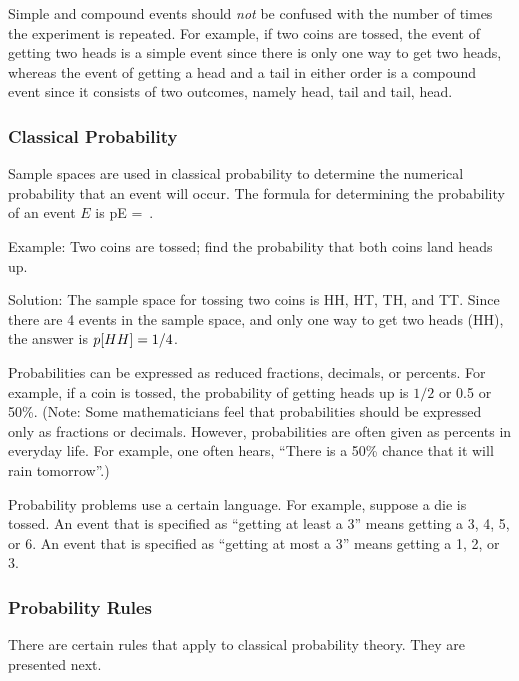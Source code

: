Simple and compound events should \emph{not} be confused with the number of times the experiment is repeated. For example, if two coins are tossed, the event of getting two heads is a simple event since there is only one way to get two heads, whereas the event of getting a head and a tail in either order is a compound event since it consists of two outcomes, namely head, tail and tail, head.


\subsubsection{Classical Probability}
Sample spaces are used in classical probability to determine the numerical probability that an event will occur. The formula for determining the probability of an event $E$ is
\beq
p\vat E = \,.
\eeq

Example: Two coins are tossed; find the probability that both coins land
heads up.

Solution: The sample space for tossing two coins is HH, HT, TH, and TT. Since there are 4 events in the sample space, and only one way to get two heads (HH), the answer is $p\!\left[{HH}\right] = 1/4$.

Probabilities can be expressed as reduced fractions, decimals, or percents. For example, if a coin is tossed, the probability of getting heads up is $1/2$ or 0.5 or 50\%. (Note: Some mathematicians feel that probabilities should be expressed only as fractions or decimals. However, probabilities are often given as percents in everyday life. For example, one often hears, ``There is a 50\% chance that it will rain tomorrow''.)

Probability problems use a certain language. For example, suppose a die is tossed. An event that is specified as ``getting at least a 3'' means getting a 3, 4, 5, or 6. An event that is specified as ``getting at most a 3'' means getting a 1, 2, or 3.


\subsubsection{Probability Rules}
There are certain rules that apply to classical probability theory. They are presented next.

